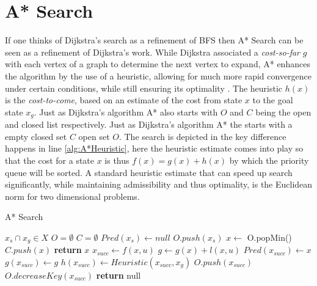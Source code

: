\section{A* Search}
If one thinks of Dijkstra's search as a refinement of BFS then A* Search can be seen as a refinement of Dijkstra's work. While Dijkstra associated a \textit{cost-so-far} $g$ with each vertex of a graph to determine the next vertex to expand, A* enhances the algorithm by the use of a heuristic, allowing for much more rapid convergence under certain conditions, while still ensuring its optimality \cite{Hart.1968}. The heuristic $h(x)$ is the  \textit{cost-to-come}, based on an estimate of the cost from state $x$ to the goal state $x_g$. Just as Dijkstra's algorithm A* also starts with $O$ and $C$ being the open and closed list respectively. Just as Dijkstra's algorithm A* the starts with a empty closed set $C$ open set $O$. The search is depicted in  the key difference happens in line \ref{alg:A*Heuristic}, here the heuristic estimate comes into play so that the cost for a state $x$ is thus $f(x) = g(x) + h(x)$ by which the priority queue will be sorted. A standard heuristic estimate that can speed up search significantly, while maintaining admissibility and thus optimality, is the Euclidean norm for two dimensional problems.

\begin{algorithm}
    \caption{A* Search}\label{alg:A*}
    \begin{algorithmic}[1]
        \Require $x_s \cap x_g \in X$
        \State $O = \emptyset$
        \State $C = \emptyset$
        \State $Pred(x_s) \gets null$
        \State $O.push(x_s)$
            \State $x \gets$ O.popMin()
            \State $C.push(x)$
                \State \textbf{return} $x$
            \Else
                \State $x_{succ} \gets f(x,u)$
                        \State $g \gets g(x) + l(x,u)$
                            \State $Pred(x_{succ}) \gets x$
                            \State $g(x_{succ}) \gets g$
                            \State $h(x_{succ}) \gets Heuristic(x_{succ}, x_g)$ \label{alg:A*Heuristic}
                                \State $O.push(x_{succ})$
                            \Else
                                \State $O.decreaseKey(x_{succ})$
                            \EndIf
                        \EndIf
                    \EndIf
                \EndFor
            \EndIf
        \EndWhile
        \State \textbf{return} null
    \end{algorithmic}
\end{algorithm}

